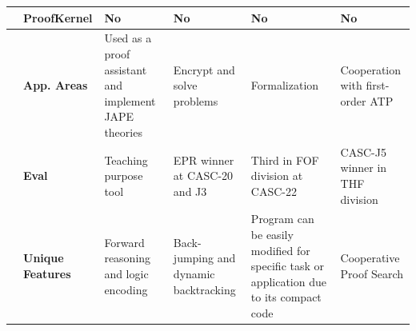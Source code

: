 \begin{table}[ht]
{\begin{tabular}{|p{}|p{}|p{4.2cm}|p{4.2cm}|p{4.2cm}|p{4.2cm}|}
 & \textbf{ProofKernel} & No & No & No & No\\ \hline
\parbox[t]{2mm}{} & \textbf{App. Areas} & Used as a proof assistant and implement JAPE theories & Encrypt and solve problems & Formalization & Cooperation with first-order ATP\\
 & \textbf{Eval} & Teaching purpose tool & EPR winner at CASC-20 and J3 &  Third in FOF division at CASC-22 & CASC-J5 winner in THF division \\
&\textbf{Unique Features} & Forward reasoning and logic encoding & Back-jumping and dynamic backtracking & Program can be easily modified for specific task or application due to its compact code & Cooperative Proof Search
 \\
\hline
\end{tabular}
}
\label{CVC4, E-Darwin, leanCoP and LEO-II}
\end{table}
